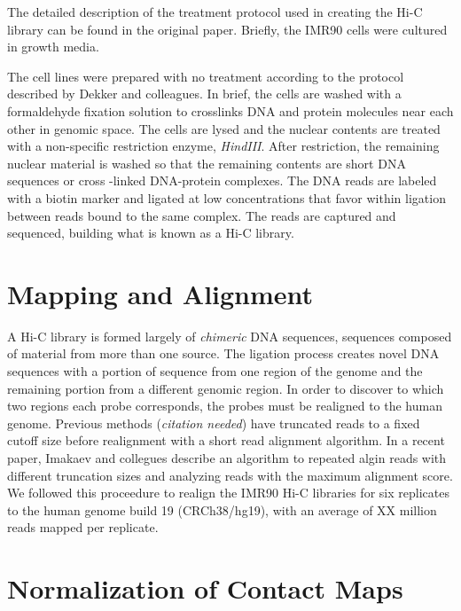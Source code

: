 \documentclass[phd,tocprelim]{cornell}
\begin{document}
The detailed description of the treatment protocol used in creating the Hi-C
library can be found in the original paper\cite{ren2013}.  Briefly, the IMR90
cells were cultured in growth media.

The cell lines were prepared with no treatment according to the protocol
described by Dekker and colleagues\cite{dekker2013}.  In brief, the cells
are washed with a formaldehyde fixation solution to crosslinks DNA and
protein molecules near each other in genomic space.  The cells are
lysed and the nuclear contents are treated with a non-specific restriction
enzyme, \textit{HindIII}.  After restriction, the remaining nuclear material
is washed so that the remaining contents are short DNA sequences or cross
-linked DNA-protein complexes.  The DNA reads are labeled with a biotin
marker and ligated at low concentrations that favor within ligation between
reads bound to the same complex.  The reads are captured and sequenced,
building what is known as a Hi-C library.





\section{Mapping and Alignment}

A Hi-C library is formed largely of \textit{chimeric} DNA sequences,
sequences composed of material from more than one source.  The ligation process
creates novel DNA sequences with a portion of sequence from one region of
the genome and the remaining portion from a different genomic region.  In
order to discover to which two regions each probe corresponds, the probes
must be realigned to the human genome.  Previous methods (\textit{citation needed})
have truncated reads to a fixed cutoff size before realignment with a short
read alignment algorithm.  In a recent paper, Imakaev and collegues
describe an algorithm to repeated algin reads with different truncation sizes
and analyzing reads with the maximum alignment score\cite{imakaev2012}.  We followed
this proceedure to realign the IMR90 Hi-C libraries for six replicates to
the human genome build 19 (CRCh38/hg19), with an average of XX million reads
mapped per replicate.

\section{Normalization of Contact Maps}
\end{document}
